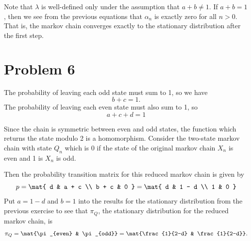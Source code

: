 \documentclass{homework}
\begin{document}
\begin{letterenum}
Note that $\lambda$ is well-defined only under the assumption that $a + b \neq 1$.
If $a + b = 1$, then we see from the previous equations that $\alpha_n$
is exactly zero for all $n>0$. That is, the markov chain converges exactly to
the stationary distribution after the first step.










\end{letterenum}

\section{Problem 6}
\begin{letterenum}
\item The probability of leaving each odd state must sum to 1, so we have
\begin{equation*}
    b + c = 1.
\end{equation*}
The probability of leaving each even state must also sum to 1, so
\begin{equation*}
    a + c + d = 1
\end{equation*}

\item Since the chain is symmetric between even and odd states, the
function which returns the state modulo 2 is a homomorphism. Consider
the two-state markov chain with state $Q_n$ which is 0 if the state of
the original markov chain $X_n$ is even and 1 is $X_n$ is odd.

Then the probability transition matrix for this reduced markov chain is given 
by
\begin{equation*}
    p = \mat{
        d & a + c \\
        b + c & 0
    } = \mat{
        d & 1 - d \\
        1 & 0
    }
\end{equation*}
Put $a = 1 - d$ and $b = 1$ into the results for the stationary distribution
from the previous exercise to see that $\pi_Q$, the stationary distribution for the
reduced markov chain, is
\begin{equation*}
    \pi_Q = \mat{\pi_{even} & \pi_{odd}} = \mat{\frac{1}{2-d} & \frac{1}{2-d}}.
\end{equation*}


\end{letterenum}
\end{document}
